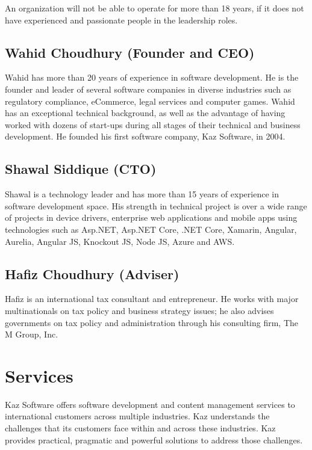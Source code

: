 An organization will not be able to operate for more than 18 years, if it does not have experienced and passionate people in the leadership roles.

\subsection[Founder and CEO]{Wahid Choudhury (Founder and CEO)}

Wahid has more than 20 years of experience in software development.
He is the founder and leader of several software companies in diverse industries such as regulatory compliance, eCommerce, legal services and computer games. 
Wahid has an exceptional technical background, as well as the advantage of having worked with dozens of start-ups during all stages of their technical and business development. He founded his first software company, Kaz Software, in 2004.

\subsection[CTO]{Shawal Siddique (CTO)}

Shawal is a technology leader and has more than 15 years of experience in software development space.
His strength in technical project is over a wide range of projects in device drivers, enterprise web applications and mobile apps using technologies such as Asp.NET, Asp.NET Core, .NET Core, Xamarin, Angular, Aurelia, Angular JS, Knockout JS, Node JS, Azure and AWS.

\subsection[Adviser]{Hafiz Choudhury (Adviser)}

Hafiz is an international tax consultant and entrepreneur.
He works with major multinationals on tax policy and business strategy issues; he also advises governments on tax policy and administration through his consulting firm, The M Group, Inc.

\section{Services}

Kaz Software offers software development and content management services to international customers across multiple industries.
Kaz understands the challenges that its customers face within and across these industries.
Kaz provides practical, pragmatic and powerful solutions to address those challenges.

